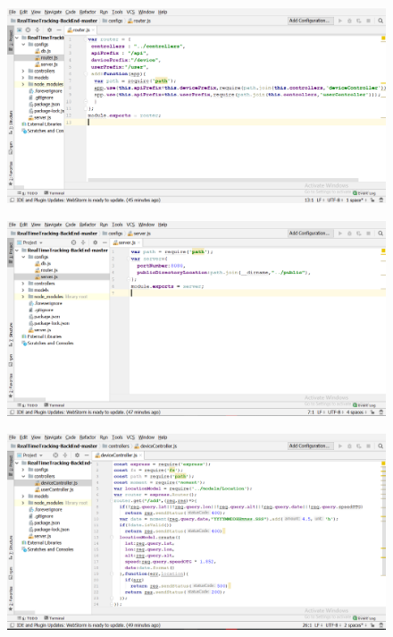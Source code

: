 \begin{enumerate}
\begin{figure}[!h]
	\end{figure}
\newpage
	\begin{figure}[!h]
		\centerline{\includegraphics[width=1.1\textwidth]{code10}}
	\end{figure}
	\begin{figure}[!h]
		\centerline{\includegraphics[width=1.1\textwidth]{code11}}
	\end{figure}
\newpage
	\begin{figure}[!h]
		\centerline{\includegraphics[width=1.1\textwidth]{code12}}
	\end{figure}

\end{enumerate}
